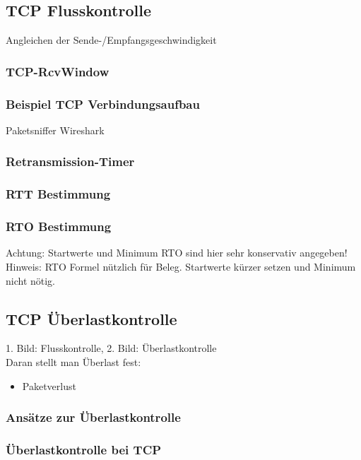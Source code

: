 \subsection{TCP Flusskontrolle}
Angleichen der Sende-/Empfangsgeschwindigkeit
\subsubsection{TCP-RcvWindow}
\subsubsection{Beispiel TCP Verbindungsaufbau}
Paketsniffer Wireshark
\subsubsection{Retransmission-Timer}
\subsubsection*{RTT Bestimmung}
\subsubsection*{RTO Bestimmung}
Achtung: Startwerte und Minimum RTO sind hier sehr konservativ angegeben!\\
Hinweis: RTO Formel nützlich für Beleg. Startwerte kürzer setzen und Minimum nicht nötig.

\subsection{TCP Überlastkontrolle}
1. Bild: Flusskontrolle, 2. Bild: Überlastkontrolle\\
Daran stellt man Überlast fest:
\begin{itemize}
\item Paketverlust
\end{itemize}
\subsubsection{Ansätze zur Überlastkontrolle}
\subsubsection{Überlastkontrolle bei TCP}
